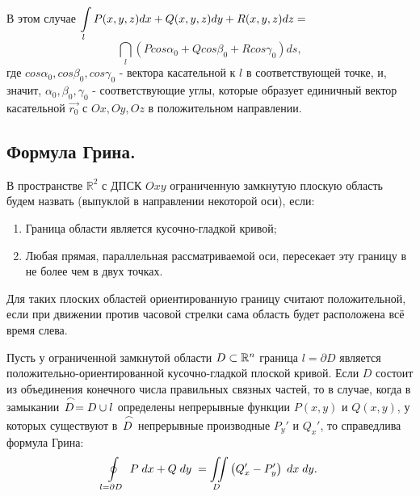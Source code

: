 В этом случае $\displaystyle\int\limits_l P(x,y,z)dx + Q(x,y,z)dy + R(x,y,z)dz = $
\begin{equation}
\label{826}
\dint_l \left( P cos \alpha_0 + Q cos \beta_0 + R cos \gamma_0 \right) 	ds,
\end{equation}
где $cos \alpha_0, cos \beta_0, cos \gamma_0$ -  вектора касательной к $l$ в соответствующей точке, и, значит, $\alpha_0, \beta_0, \gamma_0$ - соответствующие углы, которые образует единичный вектор касательной $\overrightarrow{r_0}$ с $Ox, Oy, Oz$ в положительном направлении.

\subsection{Формула Грина.}

В пространстве $ \mathbb{R}^2 $ с ДПСК $ Oxy $ ограниченную замкнутую плоскую область будем назвать  (выпуклой в направлении некоторой оси), если:
\begin{enumerate}
	\item Граница области является кусочно-гладкой кривой;
	\item Любая прямая, параллельная рассматриваемой оси, пересекает эту границу в не более чем в двух точках.
\end{enumerate}
Для таких плоских областей ориентированную границу считают положительной, если при движении против часовой стрелки сама область будет расположена всё время слева.


\begin{theorem}[Грина]
	Пусть у ограниченной замкнутой области $ D \subset \mathbb{R}^n $ граница $ l = \partial D $ является положительно-ориентированной кусочно-гладкой плоской кривой. 
	Если $ D $ состоит из объединения конечного числа правильных связных частей, то в случае, когда в замыкании $ \arc{D} = D \cup l$ 
	определены непрерывные функции $ P(x, y) $ и $ Q(x, y) $, у которых существуют в $ \arc{D} $ непрерывные производные $ P_y' $ и $ Q_x' $, то справедлива формула Грина:
	\begin{equation}
	\label{lect08-eq27-GreenF}
	\oint\limits_{l = \partial D} \; P\; dx + Q\;dy \;
	= \iint\limits_D \left(Q_x' - P_y' \right) \; dx \; dy .
	\end{equation}
\end{theorem}

